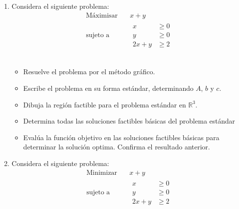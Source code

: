 \documentclass{article}
\begin{document}
\begin{enumerate}
 \item Considera el siguiente problema:
  \begin{equation*}
    \begin{aligned}
      \text{Máximisar} \quad & x+y \\
      \text{sujeto a} \quad &
      \begin{aligned}
        x & \geq 0 \\
        y & \geq 0 \\
        2x+y & \geq 2
      \end{aligned}
    \end{aligned}
  \end{equation*}
  \\
  \begin{itemize}
  \item Resuelve el problema por el método gráfico.
  \item Escribe el problema en su forma estándar, determinando $A$, $b$ y $c$.
  \item Dibuja la región factible para el problema estándar en $\mathbb{R}^3$.
  \item Determina todas las soluciones factibles básicas del problema estándar
  \item Evalúa la función objetivo en las soluciones factibles básicas para determinar la solución optima. Confirma el resultado anterior.

  \end{itemize}


\item Considera el siguiente problema:
\begin{equation*}
  \begin{aligned}
    \text{Minimizar}\quad & x+y \\
    \text{sujeto a}\quad  &
    \begin{aligned}
      x & \geq 0\\
      y & \geq 0\\
      2x+y & \geq 2
    \end{aligned}
  \end{aligned}
\end{equation*}

\end{enumerate}
\end{document}
